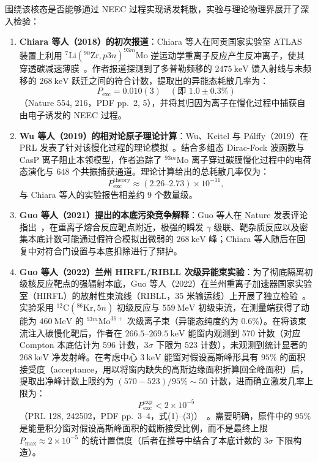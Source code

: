 围绕该核态是否能够通过 NEEC 过程实现诱发耗散，实验与理论物理界展开了深入检验：
\begin{enumerate}
\item \textbf{Chiara 等人（2018）的初次报道}：Chiara 等人在阿贡国家实验室 ATLAS 装置上利用 $^{7}\mathrm{Li}(^{90}\mathrm{Zr}, p3n)^{93m}\mathrm{Mo}$ 逆运动学重离子反应产生反冲离子，使其穿透碳减速薄膜~\cite{chiara-2018-mo93m-isomer-depletion-neec}。作者报道探测到了多普勒频移的 $2475\ \mathrm{keV}$ 馈入射线与未频移的 $268\ \mathrm{keV}$ 跃迁之间的符合计数，提取出的异能态耗散几率为：
\begin{equation}\label{eq:4-8-chiara-value}
P_{\mathrm{exc}} = 0.010(3) \quad (\text{即 } 1.0 \pm 0.3\%)
\end{equation}
（Nature 554, 216，PDF pp.~2, 5），并将其归因为离子在慢化过程中捕获自由电子诱发的 NEEC 过程。
\item \textbf{Wu 等人（2019）的相对论原子理论计算}：Wu、Keitel 与 P\'alffy（2019）在 PRL 发表了针对该慢化过程的理论模拟~\cite{wu-2019-mo93m-neec-stopping-theory}。结合多组态 Dirac-Fock 波函数与 CasP 离子阻止本领模型，作者追踪了 $^{93m}\mathrm{Mo}$ 离子穿过碳膜慢化过程中的电荷态演化与 648 个共振捕获通道。理论计算给出的总耗散几率仅为：
\begin{equation}\label{eq:4-8-wu-theory-value}
P_{\mathrm{exc}}^{\mathrm{theory}} \approx (2.26\text{--}2.73) \times 10^{-11},
\end{equation}
与 Chiara 等人的实验报告相差约 9 个数量级。
\item \textbf{Guo 等人（2021）提出的本底污染竞争解释}：Guo 等人在 Nature 发表评论指出~\cite{guo-2021-mo93m-depletion-contamination-challenge}，在重离子熔合反应靶点附近，极强的瞬发 $\gamma$ 级联、靶杂质反应以及密集本底计数可能通过假符合模拟出微弱的 $268\ \mathrm{keV}$ 峰；Chiara 等人随后在回复中对符合门设置与本底扣除进行了辩护。
\item \textbf{Guo 等人（2022）兰州 HIRFL/RIBLL 次级异能束实验}：为了彻底隔离初级核反应靶点的强辐射本底，Guo 等人（2022）在兰州重离子加速器国家实验室（HIRFL）的放射性束流线（RIBLL，35 米输运线）上开展了独立检验~\cite{guo-2022-mo93m-isomer-beam-depletion-limit}。实验采用 $^{12}\mathrm{C}(^{86}\mathrm{Kr}, 5n)$ 初级反应与 $559\ \mathrm{MeV}$ 初级束流，在测量端获得了动能为 $460\ \mathrm{MeV}$ 的 $^{93m}\mathrm{Mo}^{36+}$ 次级离子束（异能态纯度约为 $0.6\%$）。在将该束流注入碳慢化靶后，作者在 $266.5$--$269.5\ \mathrm{keV}$ 能窗内观测到 570 计数（对应 Compton 本底估计为 596 计数，$3\sigma$ 下限为 523 计数），未观测到统计显著的 $268\ \mathrm{keV}$ 净发射峰。在考虑中心 $3\ \mathrm{keV}$ 能窗对假设高斯峰形具有 $95\%$ 的面积接受度（acceptance，用以将窗内缺失的高斯边缘面积折算回全峰面积）后，提取出净峰计数上限约为 $(570 - 523)/95\% \sim 50$ 计数，进而确立激发几率上限为：
\begin{equation}\label{eq:4-8-guo-limit-value}
P_{\mathrm{exc}}^{\mathrm{exp}} < 2 \times 10^{-5}
\end{equation}
（PRL 128, 242502，PDF pp.~3--4，式(1)--(3)）~\cite{guo-2022-mo93m-isomer-beam-depletion-limit}。需要明确，原件中的 $95\%$ 是能量积分窗对假设高斯峰面积的截断接受比例，而不是最终上限 $P_{\mathrm{max}} \approx 2 \times 10^{-5}$ 的统计置信度（后者在推导中结合了本底计数的 $3\sigma$ 下限构造）。
\end{enumerate}

